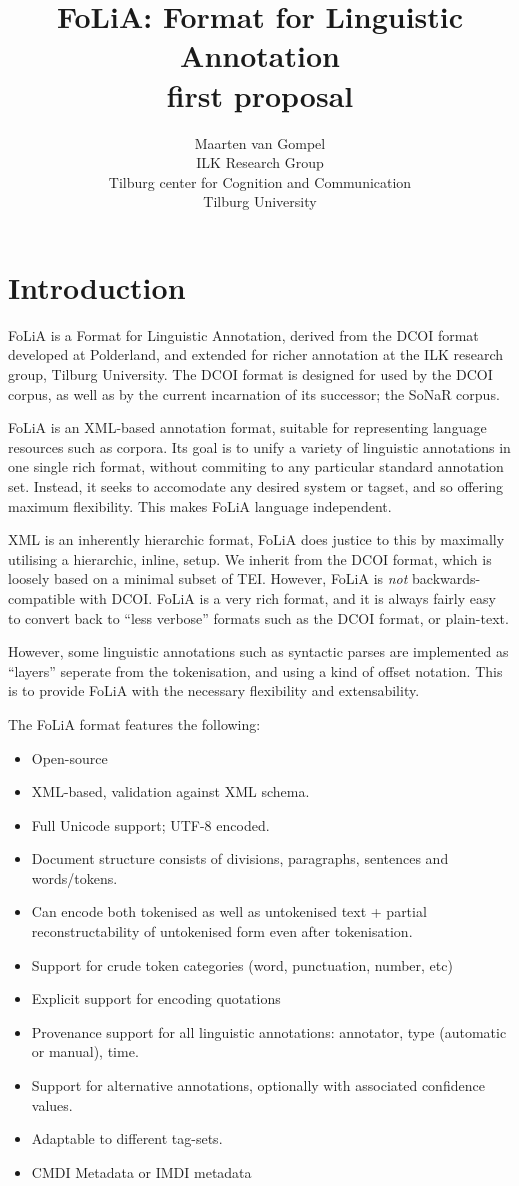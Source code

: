 \documentclass[a4paper,12pt]{article}
\title{FoLiA: Format for Linguistic Annotation \\ \small first proposal}
\author{Maarten van Gompel \\ ILK Research Group \\ Tilburg center for Cognition and Communication \\ Tilburg University }
\begin{document}
\tableofcontents
\titlepage

\section{Introduction}

FoLiA is a Format for Linguistic Annotation, derived from the DCOI\cite{DCOI} format developed at Polderland, and extended for richer annotation at the ILK research group, Tilburg University. The DCOI format is designed for used by the DCOI corpus, as well as by the current incarnation of its successor; the SoNaR corpus. 

FoLiA is an XML-based annotation format, suitable for representing language resources such as corpora. Its goal is to unify a variety of linguistic annotations in one single rich format, without commiting to any particular standard annotation set. Instead, it seeks to accomodate any desired system or tagset, and so offering maximum flexibility. This makes FoLiA language independent.


XML is an inherently hierarchic format, FoLiA does justice to this by maximally utilising a hierarchic, inline, setup. We inherit from the DCOI format, which is loosely based on a minimal subset of TEI. However, FoLiA is \emph{not} backwards-compatible with DCOI. FoLiA is a very rich format, and it is always fairly easy to convert back to ``less verbose'' formats such as the DCOI format, or plain-text. 

However, some linguistic annotations such as syntactic parses are implemented as ``layers'' seperate from the tokenisation, and using a kind of offset notation. This is to provide FoLiA with the necessary flexibility and extensability.


The FoLiA format features the following:

\begin{itemize}
\item Open-source
\item XML-based, validation against XML schema.
\item Full Unicode support; UTF-8 encoded.
\item Document structure consists of divisions, paragraphs, sentences and words/tokens.
\item Can encode both tokenised as well as untokenised text + partial reconstructability of untokenised form even after tokenisation.
\item Support for crude token categories (word, punctuation, number, etc)
\item Explicit support for encoding quotations
\item Provenance support for all linguistic annotations: annotator, type (automatic or manual), time.
\item Support for alternative annotations, optionally with associated confidence values.
\item Adaptable to different tag-sets.
\item CMDI Metadata or IMDI metadata
\end{itemize}
\end{document}

